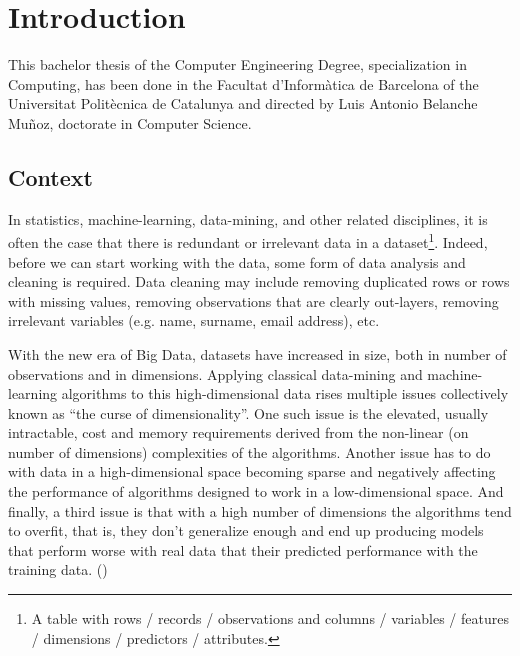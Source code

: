 
\chapter{Introduction} %

\label{Chapter1} %


This bachelor thesis of the Computer Engineering Degree, specialization in Com\-puting, has been done in the Facultat d’Informàtica de Barcelona of the Universitat Politècnica de Catalunya and directed by Luis Antonio Belanche Muñoz, doctorate in Computer Science.

\section{Context}
\label{sec:context}

In statistics, machine-learning, data-mining, and other related disciplines, it is often the case that there is redundant or irrelevant data in a dataset\footnote{A table with rows / records / observations and columns / variables / features / dimensions / predictors / attributes.}. Indeed, before we can start working with the data, some form of data analysis and cleaning is required. Data cleaning may include removing duplicated rows or rows with missing values, removing observations that are clearly out-layers, removing irrelevant variables (e.g. name, surname, email address), etc.

With the new era of Big Data, datasets have increased in size, both in number of observations and in dimensions. Applying classical data-mining and machine-learning algorithms to this high-dimensional data rises multiple issues collectively known as “the curse of dimensionality”. One such issue is the elevated, usually intractable, cost and memory requirements derived from the non-linear (on number of dimensions) complexities of the algorithms. Another issue has to do with data in a high-dimensional space becoming sparse and negatively affecting the performance of algorithms designed to work in a low-dimensional space. And finally, a third issue is that with a high number of dimensions the algorithms tend to overfit, that is, they don't generalize enough and end up producing models that perform worse with real data that their predicted performance with the training data. (\cite{li_feature_2017})

